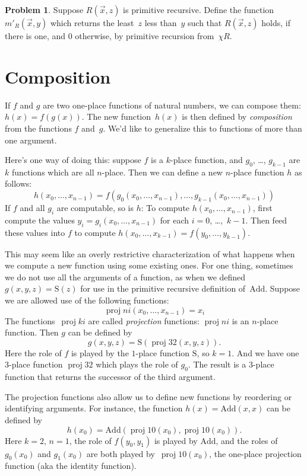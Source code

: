 \documentclass[10pt,a4paper]{article}
\theoremstyle{plain}
\theoremstyle{definition}
\newtheorem{prob}{Problem}[section]
\theoremstyle{remark}
\newcommand*{\olfileid}[3]{}
\newcommand*{\olsection}[1]{\section*{#1}}
\providecommand{\Add}{\ensuremath{\mathrm{Add}}}
\providecommand{\Succ}{\ensuremath{\mathrm{S}}}
\providecommand{\Char}{\chi}
\providecommand{\Proj}{\operatorname{proj}}
\begin{document}
\begin{prob}
Suppose $R(\vec x, z)$ is primitive recursive. Define the function
$m'_R(\vec{x}, y)$ which returns the least~$z$ less than~$y$ such that
$R(\vec{x}, z)$ holds, if there is one, and $0$ otherwise, by
primitive recursion from~$\Char{R}$.
\end{prob}





\olfileid{cmp}{rec}{com}
\olsection{Composition}

If $f$ and $g$ are two one-place functions of natural numbers, we can
compose them: $h(x) = f(g(x))$. The new function~$h(x)$ is then
defined by \emph{composition} from the functions $f$ and~$g$. We'd
like to generalize this to functions of more than one argument.

Here's one way of doing this: suppose $f$ is a $k$-place function,
and $g_0$, \dots, $g_{k-1}$ are $k$ functions which are all
$n$-place. Then we can define a new $n$-place function $h$ as follows:
\[
h(x_0, \dots, x_{n-1}) =
f(g_0(x_0, \dots, x_{n-1}), \dots, g_{k-1}(x_0, \dots, x_{n-1}))
\]
If $f$ and all $g_i$ are computable, so is $h$: To compute $h(x_0,
\dots, x_{n-1})$, first compute the values $y_i = g_i(x_0, \dots,
x_{n-1})$ for each $i = 0$, \dots,~$k-1$. Then feed these values into
$f$ to compute $h(x_0, \dots, x_{k-1}) = f(y_0, \dots, y_{k-1})$.

This may seem like an overly restrictive characterization of what
happens when we compute a new function using some existing ones. For
one thing, sometimes we do not use all the arguments of a function, as
when we defined $g(x, y, z) = \Succ(z)$ for use in the primitive
recursive definition of~$\Add$. Suppose we are allowed use of the
following functions:
\[
\Proj{n}{i}(x_0, \dots, x_{n-1}) = x_i
\]
The functions~$\Proj{k}{i}$ are called \emph{projection} functions:
$\Proj{n}{i}$ is an $n$-place function. Then $g$ can be defined by
\[
g(x, y, z) = \Succ(\Proj{3}{2}(x, y, z)).
\]
Here the role of $f$ is played by the $1$-place function $\Succ$, so
$k=1$. And we have one $3$-place function $\Proj{3}{2}$ which plays
the role of $g_0$. The result is a $3$-place function that returns the
successor of the third argument.

The projection functions also allow us to define new functions by
reordering or identifying arguments. For instance, the function $h(x)
= \Add(x, x)$ can be defined by
\[
h(x_0) = \Add(\Proj{1}{0}(x_0),\Proj{1}{0}(x_0)).
\]
Here $k=2$, $n=1$, the role of $f(y_0,y_1)$ is played by $\Add$, and
the roles of $g_0(x_0)$ and $g_1(x_0)$ are both played
by~$\Proj{1}{0}(x_0)$, the one-place projection function (aka the
identity function).
\end{document}
